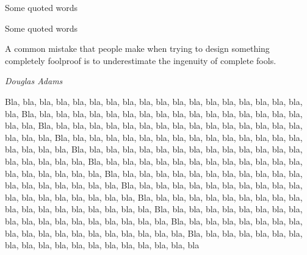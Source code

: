 \documentclass[12pt]{article}
\begin{document}
	\begin{shadequote}
		Some quoted words
	\end{shadequote}

	\begin{shadequote*}
		Some quoted words
	\end{shadequote*}

	\begin{shadequote}
		A common mistake that people make when trying to design something
		completely foolproof is to underestimate the ingenuity of complete fools.
		
		\par \emph{Douglas Adams}
	\end{shadequote}


	Bla, bla, bla, bla, bla, bla, bla, bla, bla, bla, bla, bla, bla, bla, bla, bla, bla, bla, bla,
	Bla, bla, bla, bla, bla, bla, bla, bla, bla, bla, bla, bla, bla, bla, bla, bla, bla, bla, bla,
	Bla, bla, bla, bla, bla, bla, bla, bla, bla, bla, bla, bla, bla, bla, bla, bla, bla, bla, bla,
	Bla, bla, bla, bla, bla, bla, bla, bla, bla, bla, bla, bla, bla, bla, bla, bla, bla, bla, bla,
	Bla, bla, bla, bla, bla, bla, bla, bla, bla, bla, bla, bla, bla, bla, bla, bla, bla, bla, bla,
	Bla, bla, bla, bla, bla, bla, bla, bla, bla, bla, bla, bla, bla, bla, bla, bla, bla, bla, bla,
	Bla, bla, bla, bla, bla, bla, bla, bla, bla, bla, bla, bla, bla, bla, bla, bla, bla, bla, bla,
	Bla, bla, bla, bla, bla, bla, bla, bla, bla, bla, bla, bla, bla, bla, bla, bla, bla, bla, bla,
	Bla, bla, bla, bla, bla, bla, bla, bla, bla, bla, bla, bla, bla, bla, bla, bla, bla, bla, bla,
	Bla, bla, bla, bla, bla, bla, bla, bla, bla, bla, bla, bla, bla, bla, bla, bla, bla, bla, bla,
	Bla, bla, bla, bla, bla, bla, bla, bla, bla, bla, bla, bla, bla, bla, bla, bla, bla, bla, bla,
	Bla, bla, bla, bla, bla, bla, bla, bla, bla, bla, bla, bla, bla, bla, bla, bla, bla, bla, bla
\end{document}
